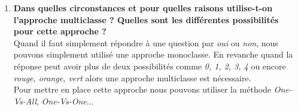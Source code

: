 \begin{enumerate}
    \item \textbf{Dans quelles circonstances et pour quelles raisons utilise-t-on l'approche multiclasse ? Quelles sont les différentes possibilités pour cette approche ?} \\
    Quand il faut simplement répondre à une question par \textit{oui} ou \textit{non}, nous pouvons simplement utilisé une approche monoclasse. En revanche quand la réponse peut avoir plus de deux possibilités comme \textit{0, 1, 2, 3, 4}
    ou encore \textit{rouge, orange, vert} alors une approche multiclasse est nécessaire. \\
    Pour mettre en place cette approche nous pouvons utiliser la méthode \textit{One-Vs-All}, \textit{One-Vs-One}...

\end{enumerate}
